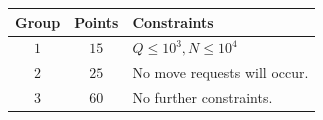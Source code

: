 \begin{center}
\begin{tabular}{| c | c | l |}
  \hline
  \textbf{Group} & \textbf{Points} & \textbf{Constraints} \\ \hline
  $1$    & $15$  & $Q \le 10^3, N \le 10^4$ \\ \hline
  $2$    & $25$  & No move requests will occur. \\ \hline
  $3$    & $60$  & No further constraints. \\ \hline
\end{tabular}
\end{center}
